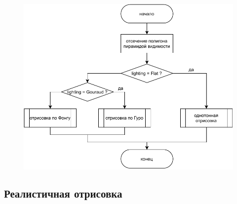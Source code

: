 \begin{figure}
	\centering
	\includegraphics[width=\linewidth,height=\textheight,keepaspectratio]{diagrams/draw-face.pdf}
\end{figure}

\subsection{Реалистичная отрисовка}

